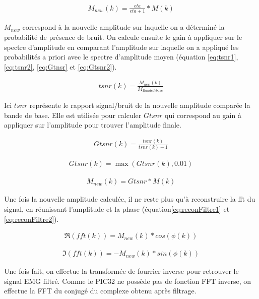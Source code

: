\documentclass[letterpaper, twoside, 12pt, memoire, creativecommons, hyperref]{thETS}
\begin{document}
\begin{align}\label{eq:newMagEta}
   M_{new}(k) = \frac{eta}{eta+1} * M(k)
\end{align}

$M_{new}$ correspond à la nouvelle amplitude sur laquelle on a déterminé la probabilité de présence de bruit. On calcule ensuite le gain à appliquer sur le spectre d'amplitude en comparant l'amplitude sur laquelle on a appliqué les probabilités a priori avec le spectre d'amplitude moyen (équation \ref{eq:tsnr1}, \ref{eq:tsnr2}, \ref{eq:Gtnsr} et \ref{eq:Gtsnr2}).

 \begin{align}\label{eq:tsnr1}
   tsnr(k) = \frac{M_{new}(k)}{M_{Bande de base}}
\end{align}

Ici $tsnr$ représente le rapport signal/bruit de la nouvelle amplitude comparée la bande de base. Elle est utilisée pour calculer $Gtsnr$ qui correspond au gain à appliquer sur l'amplitude pour trouver l'amplitude finale.

 \begin{align}\label{eq:tsnr2}
   Gtsnr(k) = \frac{tsnr(k)}{tsnr(k)+1}
\end{align}

 \begin{align}\label{eq:Gtnsr}
   Gtsnr(k) = \max(Gtsnr(k), 0.01)
\end{align}

\begin{align}\label{eq:Gtsnr2}
   M_{new}(k) = Gtsnr * M(k)
\end{align}

Une fois la nouvelle amplitude calculée, il ne reste plus qu'à reconstruire la fft du signal, en réunissant l'amplitude et la phase (équation\ref{eq:reconFiltre1} et \ref{eq:reconFiltre2}).

\begin{align}\label{eq:reconFiltre1}
   \Re(fft(k)) = M_{new}(k) * cos(\phi(k))
\end{align}

\begin{align}\label{eq:reconFiltre2}
   \Im(fft(k)) = -M_{new}(k) * sin(\phi(k))
\end{align}

Une fois fait, on effectue la transformée de fourrier inverse pour retrouver le signal EMG filtré. Comme le PIC32 ne possède pas de fonction FFT inverse, on effectue la FFT du conjugé du complexe obtenu après filtrage.
\end{document}
